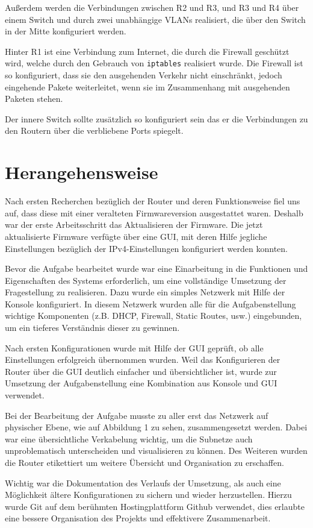 \documentclass[11pt,a4paper]{article}
\begin{document}
Außerdem werden die Verbindungen zwischen R2 und R3, und R3 und R4
über einem Switch und durch zwei unabhängige VLANs realisiert, die
über den Switch in der Mitte konfiguriert werden.
\par
Hinter R1 ist eine Verbindung zum Internet, die durch die Firewall
geschützt wird, welche durch den Gebrauch von \texttt{iptables}
realisiert wurde. Die Firewall ist so konfiguriert, dass sie den
ausgehenden Verkehr nicht einschränkt, jedoch eingehende Pakete
weiterleitet, wenn sie im Zusammenhang mit ausgehenden Paketen stehen.
\par
Der innere Switch sollte zusätzlich so konfiguriert sein das er die
Verbindungen zu den Routern über die verbliebene Ports spiegelt.

\section{Herangehensweise}
Nach ersten Recherchen bezüglich der Router und deren Funktionsweise
fiel uns auf, dass diese mit einer veralteten Firmwareversion
ausgestattet waren. Deshalb war der erste Arbeitsschritt das
Aktualisieren der Firmware. Die jetzt aktualisierte Firmware verfügte
über eine GUI, mit deren Hilfe jegliche Einstellungen bezüglich der
IPv4-Einstellungen konfiguriert werden konnten.
\par
Bevor die Aufgabe bearbeitet wurde war eine Einarbeitung in die
Funktionen und Eigenschaften des Systems erforderlich, um eine
vollständige Umsetzung der Fragestellung zu realisieren. Dazu wurde
ein simples Netzwerk mit Hilfe der Konsole konfiguriert. In diesem
Netzwerk wurden alle für die Aufgabenstellung wichtige
Komponenten (z.B. DHCP, Firewall, Static Routes, usw.) eingebunden, um
ein tieferes Verständnis dieser zu gewinnen.
\par
Nach ersten Konfigurationen wurde mit Hilfe der GUI geprüft, ob alle
Einstellungen erfolgreich übernommen wurden. Weil das Konfigurieren
der Router über die GUI deutlich einfacher und übersichtlicher ist,
wurde zur Umsetzung der Aufgabenstellung eine Kombination aus Konsole
und GUI verwendet.
\par
Bei der Bearbeitung der Aufgabe musste zu aller erst das Netzwerk auf
physischer Ebene, wie auf Abbildung 1 zu sehen, zusammengesetzt
werden. Dabei war eine übersichtliche Verkabelung wichtig, um die
Subnetze auch unproblematisch unterscheiden und visualisieren zu
können. Des Weiteren wurden die Router etikettiert um weitere
Übersicht und Organisation zu erschaffen.
\par
Wichtig war die Dokumentation des Verlaufs der Umsetzung, als auch
eine Möglichkeit ältere Konfigurationen zu sichern und wieder
herzustellen. Hierzu wurde Git auf dem berühmten Hostingplattform
Github verwendet, dies erlaubte eine bessere Organisation des Projekts
und effektivere Zusammenarbeit.
\end{document}
